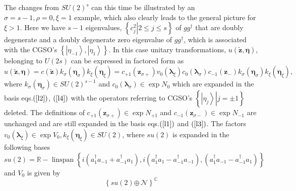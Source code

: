\documentclass[aps,preprint]{revtex4}%
\begin{document}
The changes from $SU\left(  2\right)  ^{s}$ can this time be illustrated by an
$\sigma=s-1,\rho=0,\xi=1$ example, which also clearly leads to the general
picture for $\xi>1$. Here we have $s-1$ eigenvalues, $\left\{  \left.
c_{j}^{2}\right\vert 2\leq j\leq s\right\}  $ of $gg^{\dag}$ that are doubly
degenerate and a doubly degenerate zero eigenvalue of $gg^{\dag}$, which is
associated with the CGSO's $\left\{  \left\vert \eta_{-1}\right\rangle
,\left\vert \eta_{1}\right\rangle \right\}  .$ In this case unitary
transformations, $u\left(  \mathbf{\tilde{z},\eta}\right)  $, belonging to
$U\left(  2s\right)  $ can be expressed in factored form as
\begin{equation}
u\left(  \mathbf{\tilde{z},\eta}\right)  =c\left(  \mathbf{\tilde{z}}\right)
k_{\sigma}\left(  \mathbf{\eta}_{\sigma}\right)  k_{\xi}\left(  \mathbf{\eta
}_{\xi}\right)  =c_{+1}\left(  \mathbf{z}_{\sigma+}\right)  v_{0}\left(
\mathbf{\lambda}_{\xi}\right)  c_{0}\left(  \mathbf{\lambda}_{\sigma}\right)
c_{-1}\left(  \mathbf{z}_{-}\right)  k_{\sigma}\left(  \mathbf{\eta}_{\sigma
}\right)  k_{\xi}\left(  \mathbf{\eta}_{\xi}\right)  , \label{untrans}%
\end{equation}
where $k_{\sigma}\left(  \mathbf{\eta}_{\sigma}\right)  \in SU\left(
2\right)  ^{s-1}$ and $c_{0}\left(  \mathbf{\lambda}_{\sigma}\right)  \in\exp
N_{0}$ which are expanded in the basis eqs.$\left(  \ref{l2}\right)  $,
$\left(  \ref{l4}\right)  $ with the operators referring to CGSO's $\left\{
\left.  \left\vert \eta_{j}\right\rangle \right\vert j=\pm1\right\}  $
deleted. The definitions of $c_{+1}\left(  \mathbf{z}_{\sigma+}\right)
\in\exp N_{+1}$ and $c_{-1}\left(  \mathbf{z}_{\sigma-}\right)  \in\exp
N_{-1}$ are unchanged and are still expanded in the basis eqs.$\left(
\ref{l1}\right)  $ and $\left(  \ref{l3}\right)  $. The factors $v_{0}\left(
\mathbf{\lambda}_{\xi}\right)  \in\exp V_{0},k_{\xi}\left(  \mathbf{\eta}%
_{\xi}\right)  \in SU\left(  2\right)  $, where $su\left(  2\right)  $ is
expanded in the following bases%
\begin{equation}
su\left(  2\right)  =\mathbb{R-}\operatorname{linspan}\left\{  i\left(
a_{1}^{\dagger}a_{-1}+a_{-1}^{\dagger}a_{1}\right)  ,i\left(  a_{1}^{\dagger
}a_{1}-a_{-1}^{\dagger}a_{-1}\right)  ,\left(  a_{1}^{\dagger}a_{-1}%
-a_{-1}^{\dagger}a_{1}\right)  \right\}
\end{equation}
and $V_{0}$ is given by
\begin{equation}
\left\{  su\left(  2\right)  \mathcal{\oplus\,N}\right\}  ^{\mathbb{C}}%
\end{equation}
\end{document}
